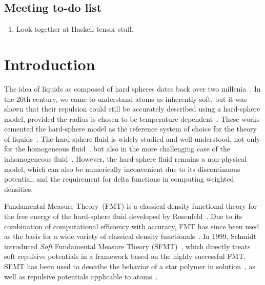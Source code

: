 \documentclass[letterpaper,twocolumn,amsmath,amssymb,prb]{revtex4-1}
\begin{document}
\subsection{Meeting to-do list}
\begin{enumerate}
\item Look together at Haskell tensor stuff.
\end{enumerate}

\section{Introduction}
The idea of liquids as composed of hard spheres dates back over two
millenia~\cite{lucretius}.  In the 20th century, we came to understand
atoms as inherently soft, but it was shown that their repulsion could
still be accurately described using a hard-sphere model, provided the
radius is chosen to be temperature
dependent~\cite{rowlinson1964statistical, barker1967perturbation,
  andersen1971relationship}.  These works cemented the hard-sphere
model as the reference system of choice for the theory of
liquids~\cite{gil-villegas-1997-SAFT-VR, clark2006developing,
  lafitte2013accurate}.  The hard-sphere fluid is
widely studied and well understood, not only for the homogeneous
fluid~\cite{carnahan1969equation}, but also in the more challenging
case of the inhomogeneous fluid~\cite{rosenfeld1989, rosenfeld1997,
  roth2002whitebear}.  However, the hard-sphere fluid remains a
non-physical model, which can also be numerically inconvenient due to its
discontinuous potential, and the requirement for delta functions in
computing weighted densities.

Fundamental Measure Theory~(FMT) is a classical density functional
theory for the free energy of the hard-sphere fluid developed by
Rosenfeld~\cite{rosenfeld1989}.  Due to its combination of
computational efficiency with accuracy, FMT has since been used as the
basis for a wide variety of classical density
functionals~\cite{cuesta1997dimensional, hansen2009fundamental,
  marechal2013density, hughes2013classical, krebs2014improved}.
%
In 1999, Schmidt introduced \emph{Soft} Fundamental Measure Theory
(SFMT)~\cite{schmidt1999density}, which directly treats soft repulsive
potentials in a framework based on the highly successful FMT.  SFMT
has been used to describe the behavior of a star polymer in
solution~\cite{schmidt2000density, groh2001density, kim2001adsorption,
  sweatman2002fundamental}, as well as repulsive potentials applicable
to atoms~\cite{schmidt2000fluid, sweatman2002fundamental}.
\end{document}
